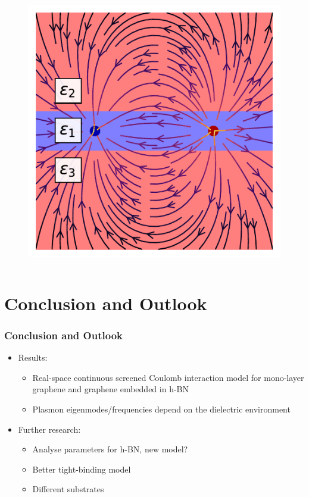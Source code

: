 \documentclass{beamer}
\begin{document}
\begin{frame}
\begin{columns}
\begin{figure}
        \includegraphics[width=\textwidth]{img/FSG_dielectric.pdf}
    \end{figure}
\end{columns}
\end{frame}


\section{Conclusion and Outlook}
\begin{frame}
  \frametitle{Conclusion and Outlook}
  \begin{itemize}
  \item Results:
  \begin{itemize}
      \item Real-space continuous screened Coulomb interaction model for mono-layer graphene and graphene embedded in h-BN
      \item Plasmon eigenmodes/frequencies depend on the dielectric environment
  \end{itemize}
  \item Further research:
  \begin{itemize}
      \item Analyse parameters for h-BN, new model?
      \item Better tight-binding model
      \item Different substrates
  \end{itemize}
  \end{itemize}
\end{frame}
\end{document}
